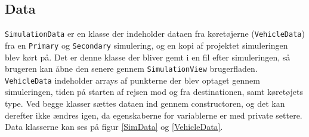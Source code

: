 \subsection*{Data}
\texttt{SimulationData} er en klasse der indeholder dataen fra køretøjerne (\texttt{VehicleData}) fra en \texttt{Primary} og \texttt{Secondary} simulering, og en kopi af projektet simuleringen blev kørt på. Det er denne klasse der bliver gemt i en fil efter simuleringen, så brugeren kan åbne den senere gennem \texttt{SimulationView} brugerfladen. \texttt{VehicleData} indeholder arrays af punkterne der blev optaget gennem simuleringen, tiden på starten af rejsen mod og fra destinationen, samt køretøjets type. Ved begge klasser sættes dataen ind gennem constructoren, og det kan derefter ikke ændres igen, da egenskaberne for variablerne er med private settere. Data klasserne kan ses på figur \ref{SimData} og \ref{VehicleData}.

